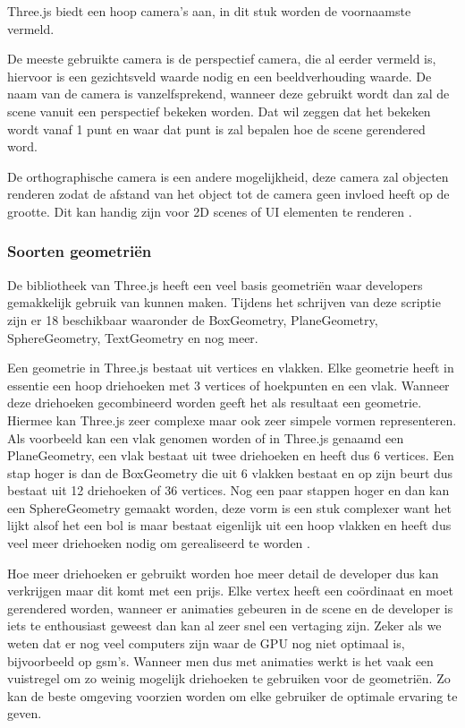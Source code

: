 Three.js biedt een hoop camera's aan, in dit stuk worden de voornaamste vermeld.

De meeste gebruikte camera is de perspectief camera, die al eerder vermeld is, hiervoor is een gezichtsveld waarde nodig en een beeldverhouding waarde. De naam van de camera is vanzelfsprekend, wanneer deze gebruikt wordt dan zal de scene vanuit een perspectief bekeken worden. Dat wil zeggen dat het bekeken wordt vanaf 1 punt en waar dat punt is zal bepalen hoe de scene gerendered word.

De orthographische camera is een andere mogelijkheid, deze camera zal objecten renderen zodat de afstand van het object tot de camera geen invloed heeft op de grootte. Dit kan handig zijn voor 2D scenes of UI elementen te renderen \autocite{threejs2023}.

\subsubsection{Soorten geometriën}

De bibliotheek van Three.js heeft een veel basis geometriën waar developers gemakkelijk gebruik van kunnen maken. Tijdens het schrijven van deze scriptie zijn er 18 beschikbaar waaronder de BoxGeometry, PlaneGeometry, SphereGeometry, TextGeometry en nog meer.

Een geometrie in Three.js bestaat uit vertices en vlakken. Elke geometrie heeft in essentie een hoop driehoeken met 3 vertices of hoekpunten en een vlak. Wanneer deze driehoeken gecombineerd worden geeft het als resultaat een geometrie. Hiermee kan Three.js zeer complexe maar ook zeer simpele vormen representeren. Als voorbeeld kan een vlak genomen worden of in Three.js genaamd een PlaneGeometry, een vlak bestaat uit twee driehoeken en heeft dus 6 vertices. Een stap hoger is dan de BoxGeometry die uit 6 vlakken bestaat en op zijn beurt dus bestaat uit 12 driehoeken of 36 vertices. Nog een paar stappen hoger en dan kan een SphereGeometry gemaakt worden, deze vorm is een stuk complexer want het lijkt alsof het een bol is maar bestaat eigenlijk uit een hoop vlakken en heeft dus veel meer driehoeken nodig om gerealiseerd te worden  \autocite{threejs2023}.

Hoe meer driehoeken er gebruikt worden hoe meer detail de developer dus kan verkrijgen maar dit komt met een prijs. Elke vertex heeft een coördinaat en moet gerendered worden, wanneer er animaties gebeuren in de scene en de developer is iets te enthousiast geweest dan kan al zeer snel een vertaging zijn. Zeker als we weten dat er nog veel computers zijn waar de GPU nog niet optimaal is, bijvoorbeeld op gsm's. Wanneer men dus met animaties werkt is het vaak een vuistregel om zo weinig mogelijk driehoeken te gebruiken voor de geometriën. Zo kan de beste omgeving voorzien worden om elke gebruiker de optimale ervaring te geven.

